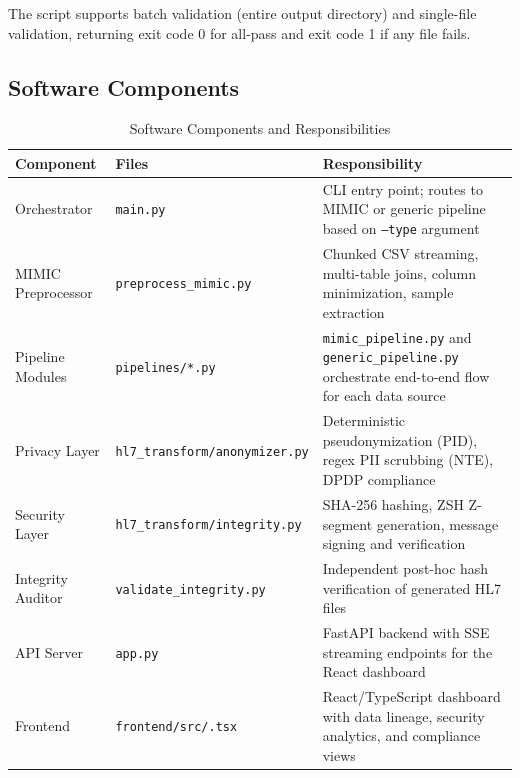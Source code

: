 \documentclass[12pt,a4paper]{report}
\begin{document}
The script supports batch validation (entire output directory) and single-file
validation, returning exit code 0 for all-pass and exit code 1 if any file fails.

\subsection{Software Components}

\begin{table}[H]
\centering
\small
\caption{Software Components and Responsibilities}
\begin{tabular}{>{\raggedright\arraybackslash}p{2.5cm} >{\raggedright\arraybackslash}p{4.5cm} >{\raggedright\arraybackslash}p{7.5cm}}
\toprule
Component & Files & Responsibility \\
\midrule
Orchestrator & \texttt{main.py} & CLI entry point; routes to MIMIC or generic pipeline based on \texttt{--type} argument \\[0.4em]
MIMIC Preprocessor & \texttt{preprocess\_mimic.py} & Chunked CSV streaming, multi-table joins, column minimization, sample extraction \\[0.4em]
Pipeline Modules & \texttt{pipelines/*.py} & \texttt{mimic\_pipeline.py} and \texttt{generic\_pipeline.py} orchestrate end-to-end flow for each data source \\[0.4em]
Privacy Layer & \texttt{hl7\_transform/\allowbreak anonymizer.py} & Deterministic pseudonymization (PID), regex PII scrubbing (NTE), DPDP compliance \\[0.4em]
Security Layer & \texttt{hl7\_transform/\allowbreak integrity.py} & SHA-256 hashing, ZSH Z-segment generation, message signing and verification \\[0.4em]
Integrity Auditor & \texttt{validate\_integrity.py} & Independent post-hoc hash verification of generated HL7 files \\[0.4em]
API Server & \texttt{app.py} & FastAPI backend with SSE streaming endpoints for the React dashboard \\[0.4em]
Frontend & \texttt{frontend/src/\allowbreak *.tsx} & React/TypeScript dashboard with data lineage, security analytics, and compliance views \\
\bottomrule
\end{tabular}
\end{table}
\end{document}
